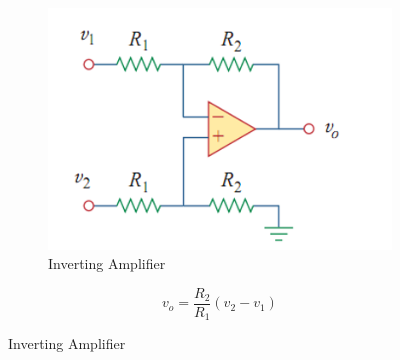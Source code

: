 \documentclass[a4paper,11pt,UTF8]{article}
\begin{document}
\begin{figure}[H]
	\begin{minipage}{.69\textwidth}
		\begin{figure}[H] 
			\centering 
			\includegraphics[scale=0.5]{./img/9.5.png}
			\caption{Inverting Amplifier}
		\end{figure}
	\end{minipage}
	\begin{minipage}{.29\textwidth}
		\LARGE{$$
			v_o=\frac{R_2}{R_1}(v_2-v_1)
			$$}
	\end{minipage}
\end{figure}
\end{document}
